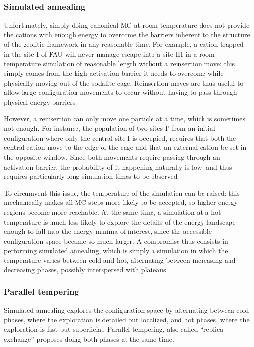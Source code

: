 \documentclass[main.tex]{subfiles}
\begin{document}
\subsubsection{Simulated annealing}

Unfortunately, simply doing canonical MC at room temperature does not provide the cations with enough energy to overcome the barriers inherent to the structure of the zeolitic framework in any reasonable time. For example, a cation trapped in the site I of FAU will never manage escape into a site III in a room-temperature simulation of reasonable length without a reinsertion move: this simply comes from the high activation barrier it needs to overcome while physically moving out of the sodalite cage. Reinsertion moves are thus useful to allow large configuration movements to occur without having to pass through physical energy barriers.

However, a reinsertion can only move one particle at a time, which is sometimes not enough. For instance, the population of two sites I' from an initial configuration where only the central site I is occupied, requires that both the central cation move to the edge of the cage and that an external cation be set in the opposite window. Since both movements require passing through an activation barrier, the probability of it happening naturally is low, and thus requires particularly long simulation times to be observed.

To circumvent this issue, the temperature of the simulation can be raised: this mechanically makes all MC steps more likely to be accepted, so higher-energy regions become more reachable. At the same time, a simulation at a hot temperature is much less likely to explore the details of the energy landscape enough to fall into the energy minima of interest, since the accessible configuration space became so much larger. A compromise thus consists in performing simulated annealing, which is simply a simulation in which the temperature varies between cold and hot, alternating between increasing and decreasing phases, possibly interspersed with plateaus.


\subsubsection{Parallel tempering}

Simulated annealing explores the configuration space by alternating between cold phases, where the exploration is detailed but localized, and hot phases, where the exploration is fast but superficial. Parallel tempering, also called ``replica exchange'' proposes doing both phases at the same time.
\end{document}
